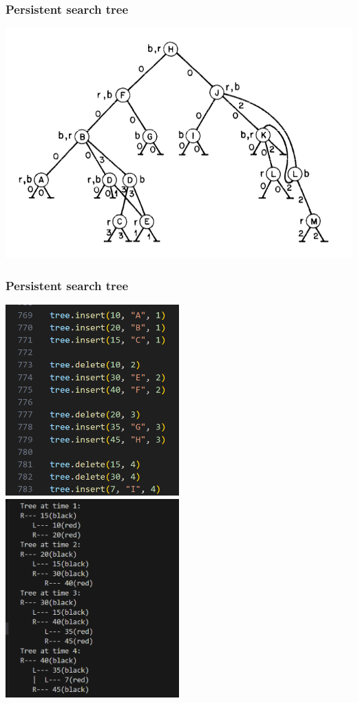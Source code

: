 \documentclass{beamer}
\begin{document}
\begin{frame}
    \frametitle{Persistent search tree}

    \includegraphics[width=1\textwidth]{psTree.png}

\end{frame}
\begin{frame}
    \frametitle{Persistent search tree}

    \includegraphics[width=0.5\textwidth]{treeCode.png}
    \includegraphics[width=0.5\textwidth]{treeOutput.png}
    
\end{frame}
\end{document}
